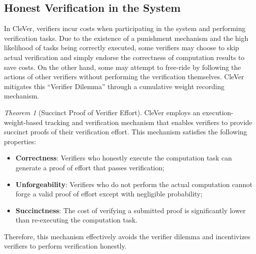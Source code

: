 \documentclass[3p]{elsarticle}
\theoremstyle{remark}
\newtheorem{theorem}{Theorem}
\begin{document}
\subsection{Honest Verification in the System}

In CleVer, verifiers incur costs when participating in the system and performing verification tasks. Due to the existence of a punishment mechanism and the high likelihood of tasks being correctly executed, some verifiers may choose to skip actual verification and simply endorse the correctness of computation results to save costs. On the other hand, some may attempt to free-ride by following the actions of other verifiers without performing the verification themselves. CleVer mitigates this “Verifier Dilemma” through a cumulative weight recording mechanism.

\begin{theorem}[Succinct Proof of Verifier Effort]
CleVer employs an execution-weight-based tracking and verification mechanism that enables verifiers to provide succinct proofs of their verification effort. This mechanism satisfies the following properties:

\begin{itemize}
  \item \textbf{Correctness}: Verifiers who honestly execute the computation task can generate a proof of effort that passes verification;
  \item \textbf{Unforgeability}: Verifiers who do not perform the actual computation cannot forge a valid proof of effort except with negligible probability;
  \item \textbf{Succinctness}: The cost of verifying a submitted proof is significantly lower than re-executing the computation task.
\end{itemize}

Therefore, this mechanism effectively avoids the verifier dilemma and incentivizes verifiers to perform verification honestly.
\end{theorem}
\end{document}
